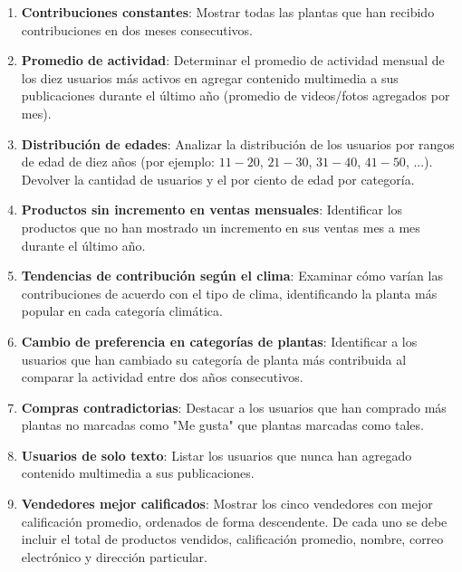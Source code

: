 \documentclass[10pt]{article}
\begin{document}
\begin{enumerate}
\begin{enumerate}
			\item \textbf{Contribuciones constantes}: Mostrar todas las plantas que han recibido contribuciones en dos meses consecutivos.
			
			\item \textbf{Promedio de actividad}: Determinar el promedio de actividad mensual de los diez usuarios más activos en agregar contenido multimedia a sus publicaciones durante el último año (promedio de videos/fotos agregados por mes).
			
			\item \textbf{Distribución de edades}: Analizar la distribución de los usuarios por rangos de edad de diez años (por ejemplo: $11-20$, $21-30$, $31-40$, $41-50$, ...). Devolver la cantidad de usuarios y el por ciento de edad por categoría.
			
			\item \textbf{Productos sin incremento en ventas mensuales}: Identificar los productos que no han mostrado un incremento en sus ventas mes a mes durante el último año.
			
			\item \textbf{Tendencias de contribución según el clima}: Examinar cómo varían las contribuciones de acuerdo con el tipo de clima, identificando la planta más popular en cada categoría climática.
			
			\item \textbf{Cambio de preferencia en categorías de plantas}: Identificar a los usuarios que han cambiado su categoría de planta más contribuida al comparar la actividad entre dos años consecutivos.
			
			\item \textbf{Compras contradictorias}: Destacar a los usuarios que han comprado más plantas no marcadas como "Me gusta" que plantas marcadas como tales.
			
			\item \textbf{Usuarios de solo texto}: Listar los usuarios que nunca han agregado contenido multimedia a sus publicaciones.
			
			\item \textbf{Vendedores mejor calificados}: Mostrar los cinco vendedores con mejor calificación promedio, ordenados de forma descendente. De cada uno se debe incluir el total de productos vendidos, calificación promedio, nombre, correo electrónico y dirección particular.
			

\end{enumerate}
\end{enumerate}
\end{document}
